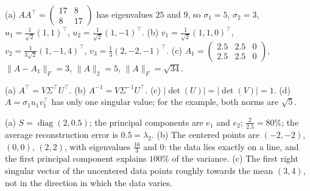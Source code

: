 \documentclass[11pt]{article}
\theoremstyle{definition}
\newcommand{\norm}[1]{\lVert #1 \rVert}
\DeclareMathOperator{\diag}{diag}
\begin{document}
\begin{description}[leftmargin=0pt, itemsep=0.3em]
    \item[\ref{pr:svd-2x3}.] (a) $AA^\top = \begin{pmatrix} 17 & 8 \\ 8 & 17 \end{pmatrix}$ has eigenvalues $25$ and $9$, so $\sigma_1 = 5$, $\sigma_2 = 3$, $u_1 = \frac{1}{\sqrt{2}}(1, 1)^\top$, $u_2 = \frac{1}{\sqrt{2}}(1, -1)^\top$. (b) $v_1 = \frac{1}{\sqrt{2}}(1, 1, 0)^\top$, $v_2 = \frac{1}{3\sqrt{2}}(1, -1, 4)^\top$, $v_3 = \frac{1}{3}(2, -2, -1)^\top$. (c) $A_1 = \begin{pmatrix} 2.5 & 2.5 & 0 \\ 2.5 & 2.5 & 0 \end{pmatrix}$, $\norm{A - A_1}_F = 3$, $\norm{A}_2 = 5$, $\norm{A}_F = \sqrt{34}$.
    \item[\ref{pr:svd-props}.] (a) $A^\top = V\Sigma^\top U^\top$. (b) $A^{-1} = V \Sigma^{-1} U^\top$. (c) $|\det(U)| = |\det(V)| = 1$. (d) $A = \sigma_1 u_1 v_1^\top$ has only one singular value; for the example, both norms are $\sqrt{5}$.
    \item[\ref{pr:pca}.] (a) $S = \diag(2, 0.5)$; the principal components are $e_1$ and $e_2$; $\frac{2}{2.5} = 80\%$; the average reconstruction error is $0.5 = \lambda_2$. (b) The centered points are $(-2, -2)$, $(0, 0)$, $(2, 2)$, with eigenvalues $\frac{16}{3}$ and $0$: the data lies exactly on a line, and the first principal component explains $100\%$ of the variance. (c) The first right singular vector of the uncentered data points roughly towards the mean $(3, 4)$, not in the direction in which the data varies.
\end{description}
\end{document}
